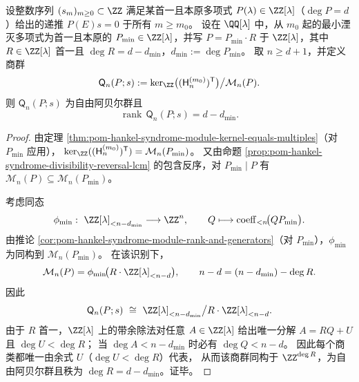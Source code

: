 \begin{theorem}[原始缺口在非极小递推下的秩等于阶数缺陷]\label{thm:pom-hankel-syndrome-gap-rank-defect}
设整数序列 \((s_m)_{m\ge 0}\subset\ZZ\) 满足某首一且本原多项式 \(P(\lambda)\in\ZZ[\lambda]\)（\(\deg P=d\)）给出的递推 \(P(E)s=0\) 于所有 \(m\ge m_0\)。
设在 \(\QQ[\lambda]\) 中，从 \(m_0\) 起的最小湮灭多项式为首一且本原的 \(P_{\min}\in\ZZ[\lambda]\)，并写
\(
P=P_{\min}\cdot R
\)
于 \(\ZZ[\lambda]\)，其中 \(R\in\ZZ[\lambda]\) 首一且 \(\deg R=d-d_{\min}\)，\(d_{\min}:=\deg P_{\min}\)。
取 \(n\ge d+1\)，并定义商群
\[
\mathsf Q_n(P;s)
:=\ker_{\ZZ}\bigl((\mathsf H^{(m_0)}_{n})^{\mathsf T}\bigr)\big/\mathcal M_n(P).
\]
则 \(\mathsf Q_n(P;s)\) 为自由阿贝尔群且
\[
\operatorname{rank}\,\mathsf Q_n(P;s)=d-d_{\min}.
\]
\end{theorem}
\begin{proof}
由定理 \ref{thm:pom-hankel-syndrome-module-kernel-equals-multiples}（对 \(P_{\min}\) 应用），
\(
\ker_{\ZZ}((\mathsf H^{(m_0)}_{n})^{\mathsf T})=\mathcal M_n(P_{\min})
\)。
又由命题 \ref{prop:pom-hankel-syndrome-divisibility-reversal-lcm} 的包含反序，对 \(P_{\min}\mid P\) 有
\(
\mathcal M_n(P)\subseteq \mathcal M_n(P_{\min})
\)。
\par
考虑同态
\[
\phi_{\min}:\ \ZZ[\lambda]_{<n-d_{\min}}\longrightarrow \ZZ^n,\qquad
Q\longmapsto \operatorname{coeff}_{<n}\!\bigl(QP_{\min}\bigr).
\]
由推论 \ref{cor:pom-hankel-syndrome-module-rank-and-generators}（对 \(P_{\min}\)），\(\phi_{\min}\) 为同构到 \(\mathcal M_n(P_{\min})\)。
在该识别下，
\[
\mathcal M_n(P)=\phi_{\min}\!\bigl(R\cdot \ZZ[\lambda]_{<n-d}\bigr),
\qquad n-d=(n-d_{\min})-\deg R.
\]
因此
\[
\mathsf Q_n(P;s)\ \cong\ \ZZ[\lambda]_{<n-d_{\min}}\big/ R\cdot\ZZ[\lambda]_{<n-d}.
\]
由于 \(R\) 首一，\(\ZZ[\lambda]\) 上的带余除法对任意 \(A\in\ZZ[\lambda]\) 给出唯一分解
\(
A=RQ+U
\)
且 \(\deg U<\deg R\)；
当 \(\deg A<n-d_{\min}\) 时必有 \(\deg Q<n-d\)。
因此每个商类都唯一由余式 \(U\)（\(\deg U<\deg R\)）代表，
从而该商群同构于 \(\ZZ^{\deg R}\)，为自由阿贝尔群且秩为 \(\deg R=d-d_{\min}\)。证毕。
\end{proof}

